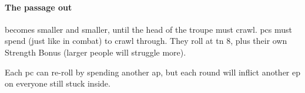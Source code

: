 \begin{multicols}{2}
\paragraph{The passage out}
becomes smaller and smaller, until the head of the troupe must crawl.
\Glspl{pc} must spend  (just like in combat) to crawl through.
They roll  at \gls{tn} 8, plus their own Strength Bonus (larger people will struggle more).

Each \gls{pc} can re-roll by spending another \gls{ap}, but each \gls{round} will inflict another \gls{ep} on everyone still stuck inside.


\end{multicols}
